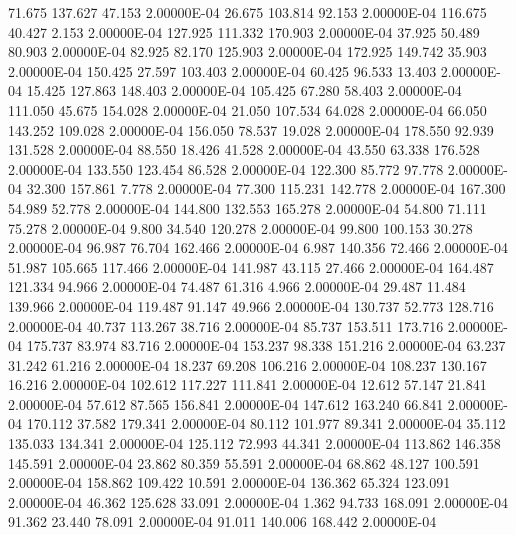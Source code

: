     71.675   137.627    47.153  2.00000E-04
    26.675   103.814    92.153  2.00000E-04
   116.675    40.427     2.153  2.00000E-04
   127.925   111.332   170.903  2.00000E-04
    37.925    50.489    80.903  2.00000E-04
    82.925    82.170   125.903  2.00000E-04
   172.925   149.742    35.903  2.00000E-04
   150.425    27.597   103.403  2.00000E-04
    60.425    96.533    13.403  2.00000E-04
    15.425   127.863   148.403  2.00000E-04
   105.425    67.280    58.403  2.00000E-04
   111.050    45.675   154.028  2.00000E-04
    21.050   107.534    64.028  2.00000E-04
    66.050   143.252   109.028  2.00000E-04
   156.050    78.537    19.028  2.00000E-04
   178.550    92.939   131.528  2.00000E-04
    88.550    18.426    41.528  2.00000E-04
    43.550    63.338   176.528  2.00000E-04
   133.550   123.454    86.528  2.00000E-04
   122.300    85.772    97.778  2.00000E-04
    32.300   157.861     7.778  2.00000E-04
    77.300   115.231   142.778  2.00000E-04
   167.300    54.989    52.778  2.00000E-04
   144.800   132.553   165.278  2.00000E-04
    54.800    71.111    75.278  2.00000E-04
     9.800    34.540   120.278  2.00000E-04
    99.800   100.153    30.278  2.00000E-04
    96.987    76.704   162.466  2.00000E-04
     6.987   140.356    72.466  2.00000E-04
    51.987   105.665   117.466  2.00000E-04
   141.987    43.115    27.466  2.00000E-04
   164.487   121.334    94.966  2.00000E-04
    74.487    61.316     4.966  2.00000E-04
    29.487    11.484   139.966  2.00000E-04
   119.487    91.147    49.966  2.00000E-04
   130.737    52.773   128.716  2.00000E-04
    40.737   113.267    38.716  2.00000E-04
    85.737   153.511   173.716  2.00000E-04
   175.737    83.974    83.716  2.00000E-04
   153.237    98.338   151.216  2.00000E-04
    63.237    31.242    61.216  2.00000E-04
    18.237    69.208   106.216  2.00000E-04
   108.237   130.167    16.216  2.00000E-04
   102.612   117.227   111.841  2.00000E-04
    12.612    57.147    21.841  2.00000E-04
    57.612    87.565   156.841  2.00000E-04
   147.612   163.240    66.841  2.00000E-04
   170.112    37.582   179.341  2.00000E-04
    80.112   101.977    89.341  2.00000E-04
    35.112   135.033   134.341  2.00000E-04
   125.112    72.993    44.341  2.00000E-04
   113.862   146.358   145.591  2.00000E-04
    23.862    80.359    55.591  2.00000E-04
    68.862    48.127   100.591  2.00000E-04
   158.862   109.422    10.591  2.00000E-04
   136.362    65.324   123.091  2.00000E-04
    46.362   125.628    33.091  2.00000E-04
     1.362    94.733   168.091  2.00000E-04
    91.362    23.440    78.091  2.00000E-04
    91.011   140.006   168.442  2.00000E-04

